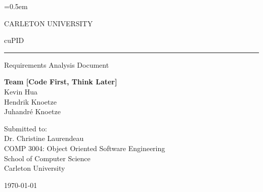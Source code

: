 \documentclass[12pt,letterpaper]{article}
\begin{document}
\renewcommand\headrule{}

\pagestyle{fancy}
\fancyhf{}
\rfoot{\thepage/\pageref{LastPage}}

\newcommand{\teamname}{Code First, Think Later}
\newcommand{\personone}{Kevin Hua}
\newcommand{\persontwo}{Hendrik Knoetze}
\newcommand{\personthree}{Juhandr\'e Knoetze}
\newcommand{\ccindent}{\hspace{1.5em}\hangindent=1.5em}

\everyrow{\hline}
\tabulinesep=0.5em
\setlength\extrarowheight{0.5em}

\thispagestyle{empty}

\begin{center}
	CARLETON UNIVERSITY
\end{center}

\vfill

\begin{center}
	{\fontsize{55pt}{55pt}\selectfont cuPID}
	\vspace{0.5em}\rule{\textwidth}{0.5pt}
	Requirements Analysis Document
\end{center}

\vspace{5em}

\begin{center}
	\textbf{Team [\teamname{}]}\\
	\personone{}\\
	\persontwo{}\\
	\personthree{}
\end{center}

\vfill

\begin{center}
	Submitted to:\\
	Dr. Christine Laurendeau\\
	COMP 3004: Object Oriented Software Engineering\\
	School of Computer Science\\
	Carleton University
\end{center}

\vspace{2em}

\begin{center}
	\today
\end{center}

\newpage{}

\tableofcontents{}
\end{document}
